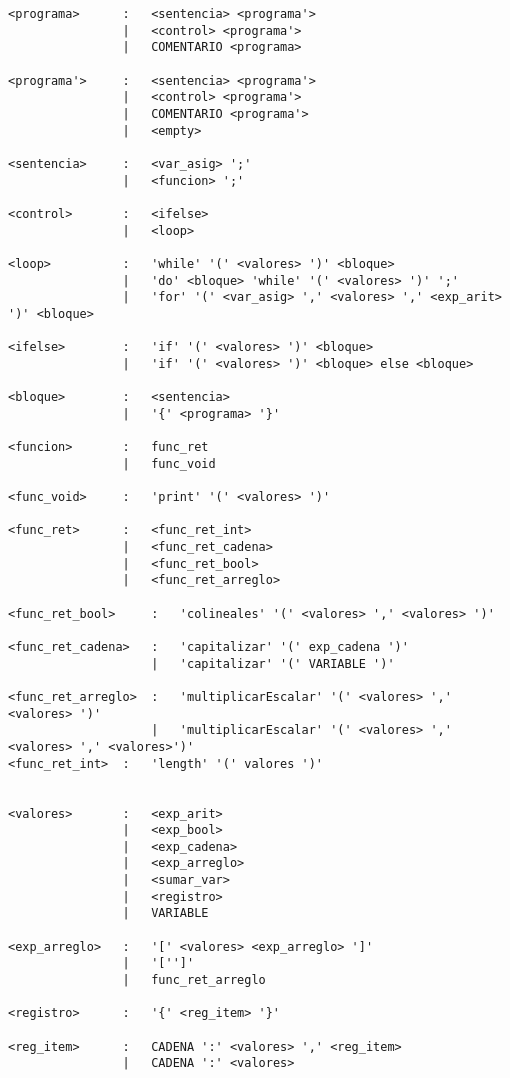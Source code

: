 \begin{verbatim}
<programa>      :   <sentencia> <programa'>   
                |   <control> <programa'>   
                |   COMENTARIO <programa>   

<programa'>     :   <sentencia> <programa'>   
                |   <control> <programa'>   
                |   COMENTARIO <programa'>   
                |   <empty>

<sentencia>     :   <var_asig> ';'
                |   <funcion> ';'

<control>       :   <ifelse>
                |   <loop>

<loop>          :   'while' '(' <valores> ')' <bloque>
                |   'do' <bloque> 'while' '(' <valores> ')' ';' 
                |   'for' '(' <var_asig> ',' <valores> ',' <exp_arit> ')' <bloque>

<ifelse>        :   'if' '(' <valores> ')' <bloque>
                |   'if' '(' <valores> ')' <bloque> else <bloque>

<bloque>        :   <sentencia>
                |   '{' <programa> '}'

<funcion>       :   func_ret
                |   func_void

<func_void>     :   'print' '(' <valores> ')'

<func_ret>      :   <func_ret_int>
                |   <func_ret_cadena>
                |   <func_ret_bool>
                |   <func_ret_arreglo>

<func_ret_bool>     :   'colineales' '(' <valores> ',' <valores> ')'

<func_ret_cadena>   :   'capitalizar' '(' exp_cadena ')'
                    |   'capitalizar' '(' VARIABLE ')'

<func_ret_arreglo>  :   'multiplicarEscalar' '(' <valores> ',' <valores> ')'
                    |   'multiplicarEscalar' '(' <valores> ',' <valores> ',' <valores>')'
<func_ret_int>  :   'length' '(' valores ')'


<valores>       :   <exp_arit>
                |   <exp_bool>
                |   <exp_cadena>
                |   <exp_arreglo>
                |   <sumar_var>
                |   <registro>
                |   VARIABLE

<exp_arreglo>   :   '[' <valores> <exp_arreglo> ']'
                |   '['']'
                |   func_ret_arreglo

<registro>      :   '{' <reg_item> '}'

<reg_item>      :   CADENA ':' <valores> ',' <reg_item>
                |   CADENA ':' <valores> 


\end{verbatim}

